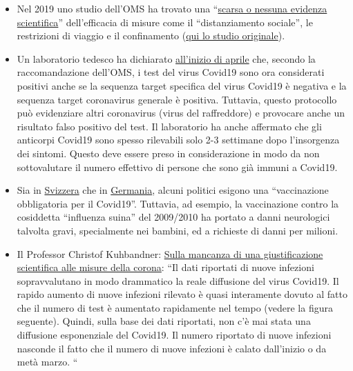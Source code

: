 \begin{itemize}
{  forzata, pubblicamente visibile}``.
\item
  Nel 2019 uno studio dell'OMS ha trovato una
  ``\href{https://www.heise.de/tp/features/COVID-19-WHO-Studie-findet-kaum-Belege-fuer-die-Wirksamkeit-von-Eindaemmungsmassnahmen-4706446.html}{scarsa
  o nessuna evidenza scientifica}'' dell'efficacia di misure come il
  ``distanziamento sociale'', le restrizioni di viaggio e il
  confinamento
  (\href{https://www.who.int/influenza/publications/public_health_measures/publication/en/}{qui
  lo studio originale}).
\item
  Un laboratorio tedesco ha dichiarato
  \href{http://www.labor-augsburg-mvz.de/de/aktuelles/coronavirus}{all'inizio
  di aprile} che, secondo la raccomandazione dell'OMS, i test del virus
  Covid19 sono ora considerati positivi anche se la sequenza target
  specifica del virus Covid19 è negativa e la sequenza target
  coronavirus generale è positiva. Tuttavia, questo protocollo può
  evidenziare altri coronavirus (virus del raffreddore) e provocare
  anche un risultato falso positivo del test. Il laboratorio ha anche
  affermato che gli anticorpi Covid19 sono spesso rilevabili solo 2-3
  settimane dopo l'insorgenza dei sintomi. Questo deve essere preso in
  considerazione in modo da non sottovalutare il numero effettivo di
  persone che sono già immuni a Covid19.
\item
  Sia in
  \href{https://www.20min.ch/schweiz/news/story/-rzte-und-Politiker-fordern-Corona-Impfzwang-20853917}{Svizzera}
  che in
  \href{https://www.faz.net/agenturmeldungen/dpa/soeder-waere-fuer-deutschlandweite-impfpflicht-gegen-corona-16738369.html}{Germania},
  alcuni politici esigono una ``vaccinazione obbligatoria per il
  Covid19''. Tuttavia, ad esempio, la vaccinazione contro la cosiddetta
  ``influenza suina'' del 2009/2010 ha portato a danni neurologici
  talvolta gravi, specialmente nei bambini, ed a richieste di danni per
  milioni.
\item
  Il Professor Christof Kuhbandner:
  \href{https://www.heise.de/tp/features/Von-der-fehlenden-wissenschaftlichen-Begruendung-der-Corona-Massnahmen-4709563.html?seite=all}{Sulla
  mancanza di una giustificazione scientifica alle misure della corona}:
  ``Il dati riportati di nuove infezioni sopravvalutano in modo
  drammatico la reale diffusione del virus Covid19. Il rapido aumento di
  nuove infezioni rilevato è quasi interamente dovuto al fatto che il
  numero di test è aumentato rapidamente nel tempo (vedere la figura
  seguente). Quindi, sulla base dei dati riportati, non c'è mai stata
  una diffusione esponenziale del Covid19. Il numero riportato di nuove
  infezioni nasconde il fatto che il numero di nuove infezioni è calato
  dall'inizio o da metà marzo. ``
\end{itemize}

